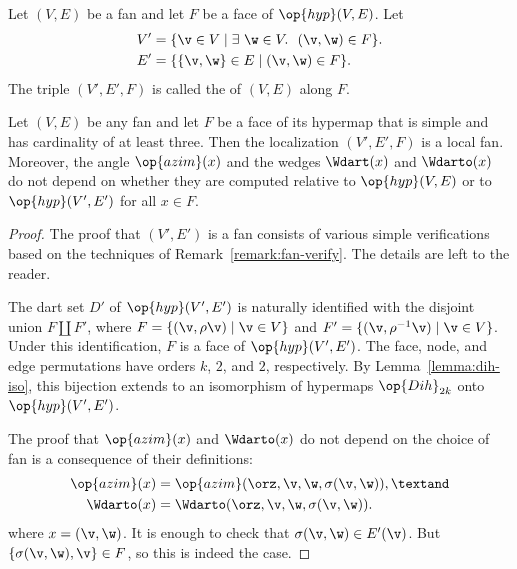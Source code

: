 \begin{definition}[localization]
\hspace{-3pt}
 Let $(V,E)$ be a fan and let $F$ be
a face of $\op{hyp}(V,E)$.  Let
\begin{align*}
V' &= \{\v\in V \mid \exists~\w\in V.~~(\v,\w)\in F\}.\\
E' &= \{\{\v,\w\} \in E\mid (\v,\w)\in F\}.
\end{align*}
The triple $(V',E',F)$ is called the  of $(V,E)$ along $F$.
\end{definition}
%


\begin{lemma}[localization]%
\label{lemma:localization}
Let $(V,E)$ be any fan and let $F$ be a face of its hypermap that is
simple and has cardinality of at least three.  Then the localization
$(V',E',F)$ is a local fan.  Moreover, the angle $\op{azim}(x)$ and
the wedges $\Wdart(x)$ and $\Wdarto(x)$ do not depend on whether they
are computed relative to $\op{hyp}(V,E)$ or to $\op{hyp}(V',E')$ for
all $x\in F$.
\end{lemma}



\begin{proof}
The proof that $(V',E')$ is a fan consists of various simple
verifications based on the techniques of
Remark~\ref{remark:fan-verify}.  The details are left to the reader.

The dart set $D'$ of $\op{hyp}(V',E')$ is naturally identified with
the disjoint union $F\coprod F'$, where $F = \{(\v,\rho\v) \mid \v\in
V\}$ and $F'=\{(\v,\rho^{-1}\v) \mid \v\in V\}$.  Under this
identification, $F$ is a face of $\op{hyp}(V',E')$.  The face, node,
and edge permutations have orders $k$, $2$, and $2$, respectively.  By
Lemma~\ref{lemma:dih-iso}, this bijection extends to an isomorphism of
hypermaps $\op{Dih}_{2k}$ onto $\op{hyp}(V',E')$.

The proof that  $\op{azim}(x)$ and $\Wdarto(x)$ do not depend on the
choice of fan is a consequence of their definitions:
\begin{align*}
\op{azim}(x) &= \op{azim}(\orz,\v,\w,\sigma(\v,\w)),\textand \\
\Wdarto(x) &= \Wdarto(\orz,\v,\w,\sigma(\v,\w)).\\
\end{align*}
where $x = (\v,\w)$.  It is enough to check that $\sigma(\v,\w)\in
E'(\v)$.  But $\{\sigma(\v,\w),\v\}\in F$, so this is indeed the case.
\end{proof}

